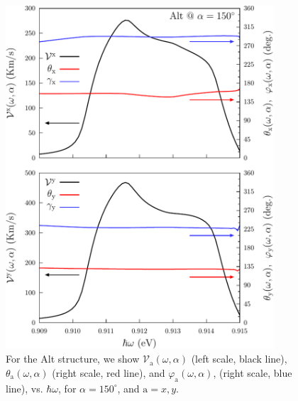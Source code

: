 \documentclass[floatfix,prb,aps,superscriptaddress,showpacs,11pt,preprint,letterpaper]{revtex4}
\def\tama{10cm}
\begin{document}
\begin{figure}[tb]
\centering
\includegraphics[width=\tama]{altplots/alt-vx-vy-w2}
\caption{For the Alt structure, we show $\mathcal{V}_{\mathrm{a}}
(\omega,\alpha)$ (left scale, black line), $\theta_{\mathrm{a}} (\omega,\alpha)$
(right scale, red line), and $\varphi_{\mathrm{a}} (\omega,\alpha)$, (right
scale, blue line), vs. $\hbar\omega$, for $\alpha=150^\circ$, and $\mathrm{a} =
x,y$. }
\label{fig:alt-vx-vy-w2}
\end{figure}
\end{document}
